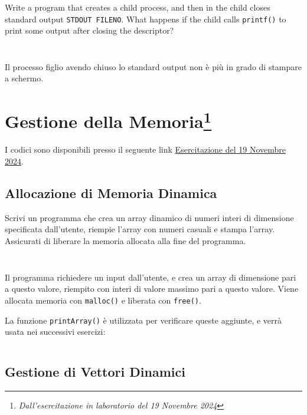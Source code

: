 \documentclass{article}
\numberwithin{equation}{subsection}
\begin{document}
Write a program that creates a child process, and then in the child closes standard output \verb|STDOUT FILENO|. 
What happens if the child calls \verb|printf()| to print some output after closing the descriptor?


\inputminted[firstline=1, lastline=4]{c}{./Esercitazione del 29-10-24/domanda7.c}
\inputminted[firstline=11, lastline=17]{c}{./Esercitazione del 29-10-24/domanda7.c}

Il processo figlio avendo chiuso lo standard output non è più in grado di stampare a schermo. 

\clearpage

\section{Gestione della Memoria\footnote{\textit{Dall'esercitazione in laboratorio del 19 Novembre 2024}}}

I codici sono disponibili presso il seguente link \href{https://github.com/00Darxk/Sistemi-Operativi/tree/main/Esercizi/Esercitazione%20del%2019-11-24/}{Esercitazione del 19 Novembre 2024}.

\subsection{Allocazione di Memoria Dinamica}

Scrivi un programma che crea un array dinamico di numeri interi di dimensione specificata dall'utente, riempie l'array con numeri casuali e stampa l'array. Assicurati di liberare la memoria allocata alla fine del programma. 

\inputminted[firstline=1, lastline=4]{c}{./Esercitazione del 19-11-24/domanda1.c}
\inputminted[firstline=20, lastline=32]{c}{./Esercitazione del 19-11-24/domanda1.c}

Il programma richiedere un input dall'utente, e crea un array di dimensione 
pari a questo valore, riempito con interi di valore massimo pari a questo valore. Viene allocata memoria con \verb|malloc()| e liberata con \verb|free()|. 

La funzione \verb|printArray()| è utilizzata per verificare queste aggiunte, e verrà 
usata nei successivi esercizi:
\inputminted[firstline=12, lastline=18]{c}{./Esercitazione del 19-11-24/domanda1.c}

\subsection{Gestione di Vettori Dinamici}
\end{document}
